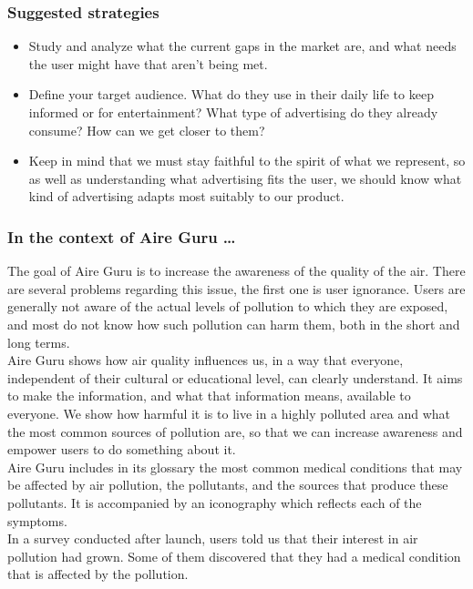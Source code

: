 \subsubsection*{Suggested strategies}

\begin{itemize}
    \item Study and analyze what the current gaps in the market are, and what needs the user might have that aren't being met.
    \item Define your target audience. What do they use in their daily life to keep informed or for entertainment?
    What type of advertising do they already consume? How can we get closer to them?
    \item Keep in mind that we must stay faithful to the spirit of what we represent, so as well as understanding what advertising fits the user,
    we should know what kind of advertising adapts most suitably to our product.
\end{itemize}

\subsubsection*{In the context of Aire Guru \ldots}

The goal of Aire Guru is to increase the awareness of the quality of the air.
There are several problems regarding this issue, the first one is user ignorance.
Users are generally not aware of the actual levels of pollution to which they are exposed, and most do not know how such pollution can harm them,
both in the short and long terms.\\

Aire Guru shows how air quality influences us, in a way that everyone, independent of their cultural or educational level, can clearly understand.
It aims to make the information, and what that information means, available to everyone.
We show how harmful it is to live in a highly polluted area and what the most common sources of pollution
are, so that we can increase awareness and empower users to do something about it.\\

Aire Guru includes in its glossary the most common medical conditions that may be affected by air pollution, the pollutants, and the sources that produce these pollutants.
It is accompanied by an iconography which reflects each of the symptoms. \\

In a survey conducted after launch, users told us that their interest in air pollution had grown.
Some of them discovered that they had a medical condition that is affected by the pollution.\\

